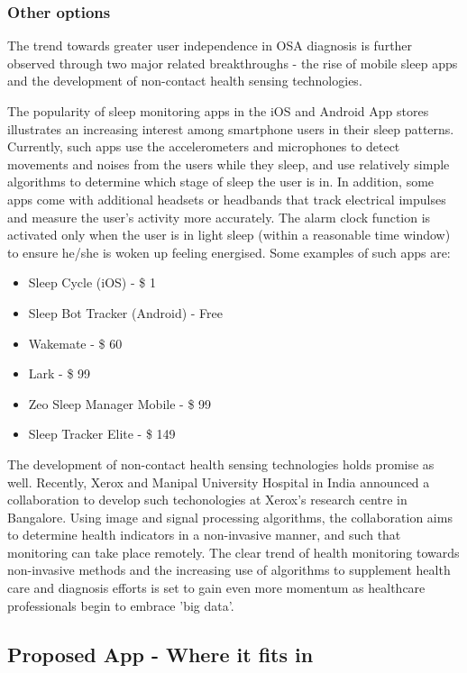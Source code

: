 \subsubsection{Other options}

The trend towards greater user independence in OSA diagnosis is further
observed through two major related breakthroughs - the rise of mobile
sleep apps and the development of non-contact health sensing technologies.

The popularity of sleep monitoring apps in the iOS and Android App
stores illustrates an increasing interest among smartphone users in
their sleep patterns. Currently, such apps use the accelerometers
and microphones to detect movements and noises from the users while they sleep, and use relatively simple algorithms to determine which stage of sleep the user is in. In addition, some apps come with additional headsets or headbands that track electrical impulses and measure the user's activity more accurately. The alarm clock function is activated only when the user is in light sleep (within a reasonable time window) to ensure he/she is woken up feeling energised. Some examples of such apps are:

\begin{itemize}
\item Sleep Cycle (iOS) - \$ 1
\item Sleep Bot Tracker (Android) - Free
\item Wakemate - \$ 60
\item Lark - \$ 99
\item Zeo Sleep Manager Mobile - \$ 99
\item Sleep Tracker Elite - \$ 149 
\end{itemize}

The development of non-contact health sensing technologies holds promise as well. Recently, Xerox and Manipal University Hospital in India announced a collaboration to develop such techonologies at Xerox's research centre in Bangalore. Using image and signal processing algorithms, the collaboration aims to determine health indicators in a non-invasive manner, and such that monitoring can take place remotely. The clear trend of health monitoring towards non-invasive methods and the increasing use of algorithms to supplement health care and diagnosis efforts is set to gain even more momentum as healthcare professionals begin to embrace 'big data'.

\subsection{Proposed App - Where it fits in}

